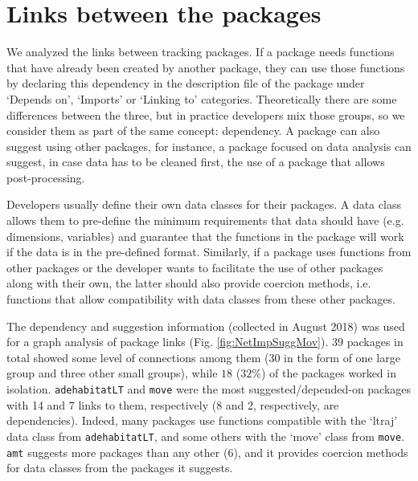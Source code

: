 \documentclass[a4paper,12pt]{article}
\newcommand{\Rpkg}[1]{\texttt{#1}}
\begin{document}
	\section*{Links between the packages}
	\label{section:links}
	
	We analyzed the links between tracking packages. If a package needs functions that have already been created by another package, they can use those functions by declaring this dependency in the description file of the package under `Depends on', `Imports' or `Linking to' categories. Theoretically there are some differences between the three, but in practice developers mix those groups, so we consider them as part of the same concept: dependency. A package can also suggest using other packages, for instance, a package focused on data analysis can suggest, in case data has to be cleaned first, the use of a package that allows post-processing. 
	
	Developers usually define their own data classes for their packages. A data class allows them to pre-define the minimum requirements that data should have (e.g. dimensions, variables) and guarantee that the functions in the package will work if the data is in the pre-defined format. Similarly, if a package uses functions from other packages or the developer wants to facilitate the use of other packages along with their own, the latter should also provide coercion methods, i.e. functions that allow compatibility with data classes from these other packages.
	
	The dependency and suggestion information (collected in August 2018) was used for a graph analysis of package links (Fig. \ref{fig:NetImpSuggMov}). $39$ packages in total showed some level of connections among them ($30$ in the form of one large group and three other small groups), while $18$ ($32\%$) of the packages worked in isolation. \Rpkg{adehabitatLT} and \Rpkg{move} were the most suggested/depended-on packages with 14 and 7 links to them, respectively (8 and 2, respectively, are dependencies). Indeed, many packages use functions compatible with the `ltraj' data class from \Rpkg{adehabitatLT}, and some others with the `move' class from \Rpkg{move}. \Rpkg{amt} suggests more packages than any other (6), and it provides coercion methods for data classes from the packages it suggests. 
	
\end{document}
